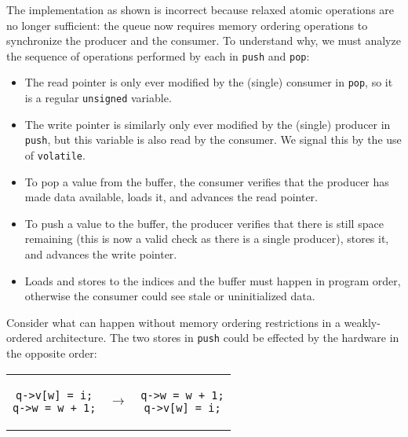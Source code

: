 The implementation as shown is incorrect because relaxed atomic operations are
no longer sufficient: the queue now requires memory ordering operations to
synchronize the producer and the consumer.  To understand why, we must analyze
the sequence of operations performed by each in \texttt{push} and \texttt{pop}:

\begin{itemize}
    \item
        The read pointer is only ever modified by the (single) consumer in
        \texttt{pop}, so it is a regular \texttt{unsigned} variable.
    \item
        The write pointer is similarly only ever modified by the (single)
        producer in \texttt{push}, but this variable is also read by the
        consumer.  We signal this by the use of \texttt{volatile}\footnotemark.
    \item
        To pop a value from the buffer, the consumer verifies that the producer
        has made data available, loads it, and advances the read pointer.
    \item
        To push a value to the buffer, the producer verifies that there is still
        space remaining (this is now a valid check as there is a single
        producer), stores it, and advances the write pointer.
    \item
        Loads and stores to the indices and the buffer must happen in program
        order, otherwise the consumer could see stale or uninitialized data.
\end{itemize}

Consider what can happen without memory ordering restrictions in a
weakly-ordered architecture.  The two stores in \texttt{push} could be effected
by the hardware in the opposite order\footnotemark:


\begin{center}
    \begin{tabular}{ccc}
        \begin{lstlisting}[style=c]
q->v[w] = i;
q->w = w + 1;
        \end{lstlisting}
        & $\to$ &
        \begin{lstlisting}[style=c]
q->w = w + 1;
q->v[w] = i;
        \end{lstlisting} \\[0.5em]
    \end{tabular}
\end{center}

